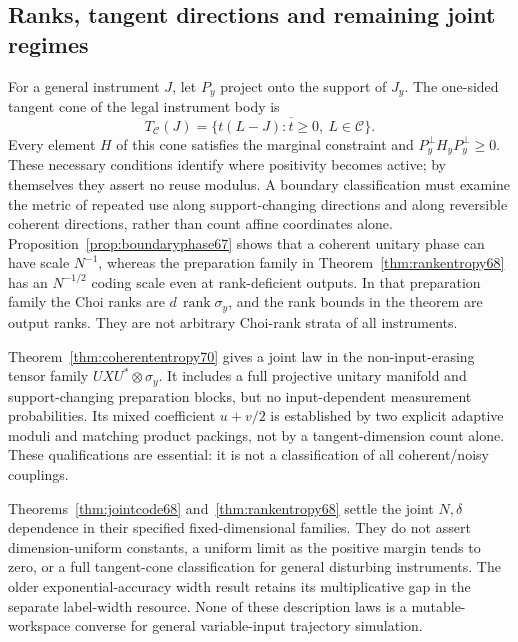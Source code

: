 \subsection{Ranks, tangent directions and remaining joint regimes}
For a general instrument $J$, let $P_y$ project onto the support of
$J_y$. The one-sided tangent cone of the legal instrument body is
\[
 T_{\mathcal C}(J)=\overline{\{t(L-J):t\ge0,\ L\in\mathcal C\}}.
\]
Every element $H$ of this cone satisfies the marginal constraint and
$P_y^\perp H_yP_y^\perp\ge0$. These necessary conditions identify
where positivity becomes active; by themselves they assert no reuse
modulus. A boundary classification must examine the metric of
repeated use along support-changing directions and along reversible
coherent directions, rather than count affine coordinates alone.
Proposition~\ref{prop:boundaryphase67} shows that a coherent unitary
phase can have scale $N^{-1}$, whereas the preparation family in
Theorem~\ref{thm:rankentropy68} has an $N^{-1/2}$ coding scale even
at rank-deficient outputs. In that preparation family the Choi ranks
are $d\,\operatorname{rank}\sigma_y$, and the rank bounds in the
theorem are output ranks. They are not arbitrary Choi-rank strata of
all instruments.

Theorem~\ref{thm:coherententropy70} gives a joint law in the
non-input-erasing tensor family $UXU^*\otimes\sigma_y$. It includes a
full projective unitary manifold and support-changing preparation blocks,
but no input-dependent measurement probabilities. Its mixed coefficient
$u+v/2$ is established by two explicit adaptive moduli and matching product
packings, not by a tangent-dimension count alone. These qualifications are
essential: it is not a classification of all coherent/noisy couplings.

Theorems~\ref{thm:jointcode68} and~\ref{thm:rankentropy68} settle the
joint $N,\delta$ dependence in their specified fixed-dimensional
families. They do not assert dimension-uniform constants, a uniform
limit as the positive margin tends to zero, or a full tangent-cone
classification for general disturbing instruments. The older
exponential-accuracy width result retains its multiplicative gap in
the separate label-width resource. None of these description laws
is a mutable-workspace converse for general variable-input
trajectory simulation.


